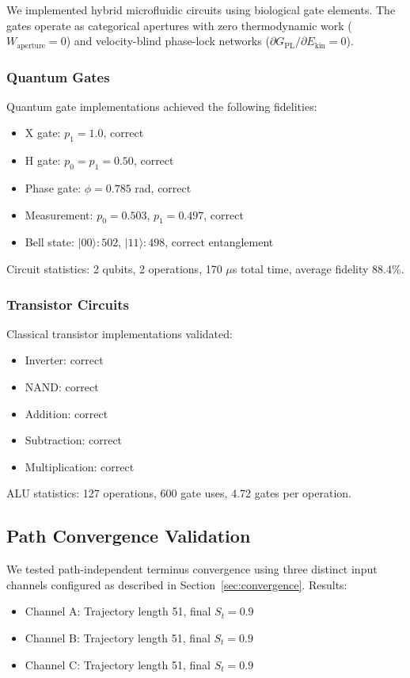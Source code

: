\documentclass[aps,prl,twocolumn,superscriptaddress,showpacs]{revtex4-2}
\newcommand{\St}{S_t}
\newcommand{\Gfree}{G_{\text{PL}}}
\newcommand{\Ekin}{E_{\text{kin}}}
\newcommand{\Wapert}{W_{\text{aperture}}}
\begin{document}
We implemented hybrid microfluidic circuits using biological gate elements. The gates operate as categorical apertures with zero thermodynamic work ($\Wapert = 0$) and velocity-blind phase-lock networks ($\partial \Gfree / \partial \Ekin = 0$).

\subsubsection{Quantum Gates}

Quantum gate implementations achieved the following fidelities:
\begin{itemize}
\item X gate: $p_1 = 1.0$, correct
\item H gate: $p_0 = p_1 = 0.50$, correct
\item Phase gate: $\phi = 0.785$ rad, correct
\item Measurement: $p_0 = 0.503$, $p_1 = 0.497$, correct
\item Bell state: $|00\rangle: 502$, $|11\rangle: 498$, correct entanglement
\end{itemize}

Circuit statistics: 2 qubits, 2 operations, 170 $\mu$s total time, average fidelity 88.4\%.

\subsubsection{Transistor Circuits}

Classical transistor implementations validated:
\begin{itemize}
\item Inverter: correct
\item NAND: correct
\item Addition: correct
\item Subtraction: correct
\item Multiplication: correct
\end{itemize}

ALU statistics: 127 operations, 600 gate uses, 4.72 gates per operation.

\subsection{Path Convergence Validation}

We tested path-independent terminus convergence using three distinct input channels configured as described in Section~\ref{sec:convergence}. Results:
\begin{itemize}
\item Channel A: Trajectory length 51, final $\St = 0.9$
\item Channel B: Trajectory length 51, final $\St = 0.9$
\item Channel C: Trajectory length 51, final $\St = 0.9$
\end{itemize}
\end{document}

